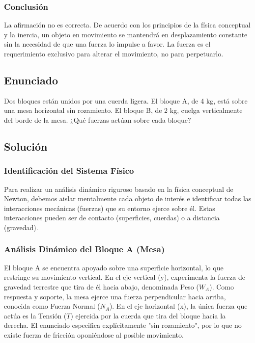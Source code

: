 \documentclass[12pt]{article}
\begin{document}
\subsubsection*{Conclusión}
La afirmación no es correcta. De acuerdo con los principios de la física conceptual y la inercia, un objeto en movimiento se mantendrá en desplazamiento constante sin la necesidad de que una fuerza lo impulse a favor. La fuerza es el requerimiento exclusivo para alterar el movimiento, no para perpetuarlo.

\newpage

\subsection*{Enunciado}
Dos bloques están unidos por una cuerda ligera. El bloque A, de 4 kg, está sobre una mesa horizontal sin rozamiento. El bloque B, de 2 kg, cuelga verticalmente del borde de la mesa. ¿Qué fuerzas actúan sobre cada bloque?

\subsection*{Solución}

\subsubsection*{Identificación del Sistema Físico}
Para realizar un análisis dinámico riguroso basado en la física conceptual de Newton, debemos aislar mentalmente cada objeto de interés e identificar todas las interacciones mecánicas (fuerzas) que su entorno ejerce sobre él. Estas interacciones pueden ser de contacto (superficies, cuerdas) o a distancia (gravedad).

\subsubsection*{Análisis Dinámico del Bloque A (Mesa)}
El bloque A se encuentra apoyado sobre una superficie horizontal, lo que restringe su movimiento vertical. En el eje vertical (y), experimenta la fuerza de gravedad terrestre que tira de él hacia abajo, denominada Peso ($W_A$). Como respuesta y soporte, la mesa ejerce una fuerza perpendicular hacia arriba, conocida como Fuerza Normal ($N_A$). En el eje horizontal (x), la única fuerza que actúa es la Tensión ($T$) ejercida por la cuerda que tira del bloque hacia la derecha. El enunciado especifica explícitamente "sin rozamiento", por lo que no existe fuerza de fricción oponiéndose al posible movimiento.
\end{document}
